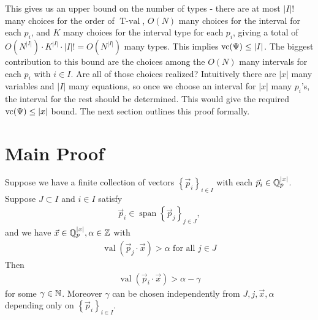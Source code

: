 \documentclass{amsart}
\newcommand{\curly}[1]{\left\{#1\right\}}
\DeclareMathOperator{\vecspan}{span}
\DeclareMathOperator{\val}{val}
\DeclareMathOperator{\tval}{T-val}
\begin{document}
This gives us an upper bound on the number of types - there are at most $|I|!$ many choices for the order of $\tval$,
$O(N)$ many choices for the interval for each $p_i$,
and $K$ many choices for the interval type for each $p_i$,
giving a total of $O(N^{|I|}) \cdot K^{|I|} \cdot |I|! = O(N^{|I|})$ many types.
This implies $\operatorname{vc}(\Psi) \leq |I|$.
The biggest contribution to this bound are the choices among the $O(N)$ many intervals for each $p_i$ with $i \in I$.
Are all of those choices realized?
Intuitively there are $|x|$ many variables and $|I|$ many equations,
so once we choose an interval for $|x|$ many $p_i$'s, the interval for the rest should be determined.
This would give the required $\operatorname{vc}(\Psi) \leq |x|$ bound.
The next section outlines this proof formally.



\section{Main Proof}


\begin{Lemma}	 \label{gamma}
  Suppose we have a finite collection of vectors $\curly{\vec p_i}_{i \in I}$ with each $\vec p_i \in \mathbb{Q}_p^{|x|}$.
  Suppose $J \subset I$ and $i \in I$ satisfy
  \begin{align*}
    \vec p_i \in \vecspan \curly{\vec p_j}_{j \in J}, 
  \end{align*}
  and we have $\vec x \in \mathbb{Q}_p^{|x|}, \alpha \in \mathbb{Z}$ with
  \begin{align*}
    \val(\vec p_j \cdot \vec x) > \alpha \text{ for all } j \in J
  \end{align*}
  Then
  \begin{align*}
    \val(\vec p_i \cdot \vec x) > \alpha - \gamma
  \end{align*}
  for some $\gamma \in \mathbb{N}$.
  Moreover $\gamma$ can be chosen independently from $J, j, \vec x, \alpha$ depending only on $\curly{\vec p_i}_{i \in I}$.
\end{Lemma}
\end{document}
